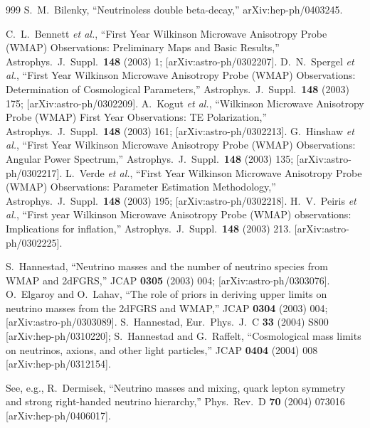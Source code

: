 \begin{thebibliography}{999}
S.~M.~Bilenky,
``Neutrinoless double beta-decay,''
arXiv:hep-ph/0403245.

C.~L.~Bennett {\it et al.},
``First Year Wilkinson Microwave Anisotropy Probe (WMAP) Observations:
Preliminary Maps and Basic Results,''
Astrophys.\ J.\ Suppl.\  {\bf 148} (2003) 1;
[arXiv:astro-ph/0302207].
D.~N.~Spergel {\it et al.},
``First Year Wilkinson Microwave Anisotropy Probe (WMAP) Observations:
Determination of Cosmological Parameters,''
Astrophys.\ J.\ Suppl.\  {\bf 148} (2003) 175;
[arXiv:astro-ph/0302209].
A.~Kogut {\it et al.},
``Wilkinson Microwave Anisotropy Probe (WMAP) First Year Observations: TE
Polarization,''
Astrophys.\ J.\ Suppl.\  {\bf 148} (2003) 161;
[arXiv:astro-ph/0302213].
G.~Hinshaw {\it et al.},
``First Year Wilkinson Microwave Anisotropy Probe (WMAP) Observations: Angular
Power Spectrum,''
Astrophys.\ J.\ Suppl.\  {\bf 148} (2003) 135;
[arXiv:astro-ph/0302217].
L.~Verde {\it et al.},
``First Year Wilkinson Microwave Anisotropy Probe (WMAP) Observations:
Parameter Estimation Methodology,''
Astrophys.\ J.\ Suppl.\  {\bf 148} (2003) 195;
[arXiv:astro-ph/0302218].
H.~V.~Peiris {\it et al.},
``First year Wilkinson Microwave Anisotropy Probe (WMAP) observations:
Implications for inflation,''
Astrophys.\ J.\ Suppl.\  {\bf 148} (2003) 213.
[arXiv:astro-ph/0302225].

S.~Hannestad,
``Neutrino masses and the number of neutrino species from WMAP and  2dFGRS,''
JCAP {\bf 0305} (2003) 004;
[arXiv:astro-ph/0303076].
O.~Elgaroy and O.~Lahav,
``The role of priors in deriving upper limits on neutrino masses from the  2dFGRS and WMAP,''
JCAP {\bf 0304} (2003) 004;
[arXiv:astro-ph/0303089].
S.~Hannestad,
  Eur.\ Phys.\ J.\ C {\bf 33} (2004) S800
  [arXiv:hep-ph/0310220];
 S.~Hannestad and G.~Raffelt,
  ``Cosmological mass limits on neutrinos, axions, and other light
  particles,''
  JCAP {\bf 0404} (2004) 008
  [arXiv:hep-ph/0312154].

See, e.g., 
  R.~Dermisek,
  ``Neutrino masses and mixing, quark lepton symmetry and strong  right-handed
  neutrino hierarchy,''
  Phys.\ Rev.\ D {\bf 70} (2004) 073016
  [arXiv:hep-ph/0406017].


\end{thebibliography}

